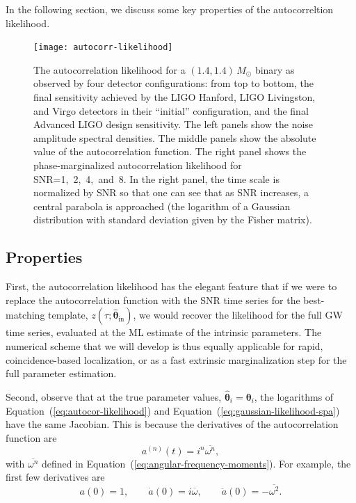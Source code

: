 \documentclass[amsmath,amssymb,aps,prx,reprint,nopreprintnumbers,nofootinbib]{revtex4-1}
\begin{document}
In the following section, we discuss some key properties of the autocorreltion likelihood.

\begin{figure}
    \texttt{[image: autocorr-likelihood]}
    \caption{\label{fig:autocorr-likelihood}The autocorrelation likelihood for a $(1.4, 1.4)$\,$M_\odot$ binary as observed by four detector configurations: from top to bottom, the final sensitivity achieved by the \acs{LIGO} Hanford, \acs{LIGO} Livingston, and Virgo detectors in their ``initial'' configuration, and the final Advanced \acs{LIGO} design sensitivity. The left panels show the noise amplitude spectral densities. The middle panels show the absolute value of the autocorrelation function. The right panel shows the phase-marginalized autocorrelation likelihood for \ac{SNR}=1,~2,~4,~and~8. In the right panel, the time scale is normalized by \ac{SNR} so that one can see that as \ac{SNR} increases, a central parabola is approached (the logarithm of a Gaussian distribution with standard deviation given by the Fisher matrix).}
\end{figure}

\subsection{Properties}
\label{sec:properties}

First, the autocorrelation likelihood has the elegant feature that if we were to replace the autocorrelation function with the \ac{SNR} time series for the best-matching template, $z(\tau; \hat{\mathbf{\theta}}_\mathrm{in})$, we would recover the likelihood for the full \ac{GW} time series, evaluated at the \ac{ML} estimate of the intrinsic parameters. The numerical scheme that we will develop is thus equally applicable for rapid, coincidence-based localization, or as a fast extrinsic marginalization step for the full parameter estimation.

Second, observe that at the true parameter values, $\hat{\bm\theta}_i = \bm\theta_i$, the logarithms of Equation~(\ref{eq:autocor-likelihood}) and Equation~(\ref{eq:gaussian-likelihood-spa}) have the same Jacobian. This is because the derivatives of the autocorrelation function are
%
\begin{equation*}
    a^{(n)}(t) = i^n \overline{\omega^n},
\end{equation*}
%
with $\overline{\omega^n}$ defined in Equation~(\ref{eq:angular-frequency-moments}). For example, the first few derivatives are
%
\begin{equation*}
    a(0) = 1,
    \qquad
    \dot{a}(0) = i \overline{\omega},
    \qquad
    \ddot{a}(0) = -\overline{\omega^2}.
\end{equation*}
\end{document}
